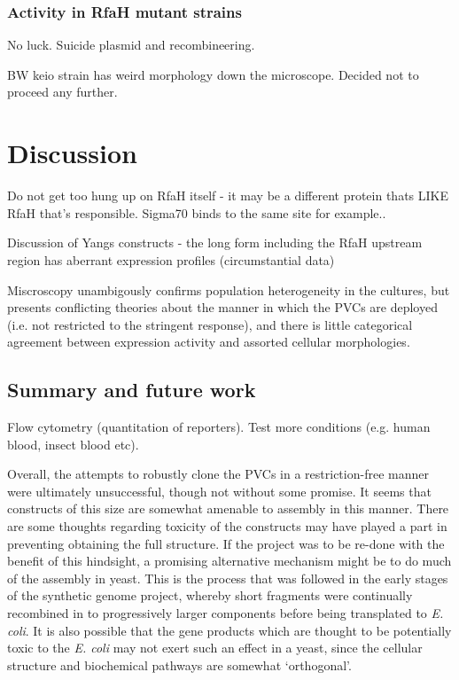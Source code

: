 \subsubsection{Activity in RfaH mutant strains}

No luck. Suicide plasmid and recombineering.

BW keio strain has weird morphology down the microscope. Decided not to proceed any further.

\section{Discussion}

Do not get too hung up on RfaH itself - it may be a different protein thats LIKE RfaH that's responsible. Sigma70 binds to the same site for example..\citep{Sevostyanova2008}

Discussion of Yangs constructs - the long form including the RfaH upstream region has aberrant expression profiles (circumstantial data)

Miscroscopy unambigously confirms population heterogeneity in the cultures, but presents conflicting theories about the manner in which the PVCs are deployed (i.e. not restricted to the stringent response), and there is little categorical agreement between expression activity and assorted cellular morphologies.


\subsection{Summary and future work}
Flow cytometry (quantitation of reporters). Test more conditions (e.g. human blood, insect blood etc).

Overall, the attempts to robustly clone the PVCs in a restriction-free manner were ultimately unsuccessful, though not without some promise. It seems that constructs of this size are somewhat amenable to assembly in this manner. There are some thoughts regarding toxicity of the constructs may have played a part in preventing obtaining the full structure. If the project was to be re-done with the benefit of this hindsight, a promising alternative mechanism might be to do much of the assembly in yeast. This is the process that was followed in the early stages of the synthetic genome project, whereby short fragments were continually recombined in to progressively larger components before being transplated to \emph{E. coli}. It is also possible that the gene products which are thought to be potentially toxic to the \emph{E. coli} may not exert such an effect in a yeast, since the cellular structure and biochemical pathways are somewhat `orthogonal'.

